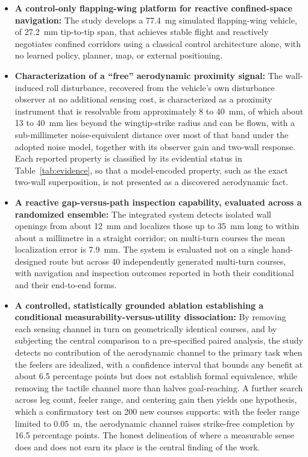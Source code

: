 \documentclass[final,5p,times]{elsarticle}
\begin{document}
\begin{itemize}
    \item \textbf{A control-only flapping-wing platform for reactive confined-space navigation:} The study develops a 77.4~mg simulated flapping-wing vehicle, of 27.2~mm tip-to-tip span, that achieves stable flight and reactively negotiates confined corridors using a classical control architecture alone, with no learned policy, planner, map, or external positioning.
    \item \textbf{Characterization of a ``free'' aerodynamic proximity signal:} The wall-induced roll disturbance, recovered from the vehicle's own disturbance observer at no additional sensing cost, is characterized as a proximity instrument that is resolvable from approximately 8 to 40~mm, of which about 13 to 40~mm lies beyond the wingtip-strike radius and can be flown, with a sub-millimeter noise-equivalent distance over most of that band under the adopted noise model, together with its observer gain and two-wall response. Each reported property is classified by its evidential status in Table~\ref{tab:evidence}, so that a model-encoded property, such as the exact two-wall superposition, is not presented as a discovered aerodynamic fact.
    \item \textbf{A reactive gap-versus-path inspection capability, evaluated across a randomized ensemble:} The integrated system detects isolated wall openings from about 12~mm and localizes those up to 35~mm long to within about a millimetre in a straight corridor; on multi-turn courses the mean localization error is 7.9~mm. The system is evaluated not on a single hand-designed route but across 40 independently generated multi-turn courses, with navigation and inspection outcomes reported in both their conditional and their end-to-end forms.
    \item \textbf{A controlled, statistically grounded ablation establishing a conditional measurability-versus-utility dissociation:} By removing each sensing channel in turn on geometrically identical courses, and by subjecting the central comparison to a pre-specified paired analysis, the study detects no contribution of the aerodynamic channel to the primary task when the feelers are idealized, with a confidence interval that bounds any benefit at about 6.5 percentage points but does not establish formal equivalence, while removing the tactile channel more than halves goal-reaching. A further search across leg count, feeler range, and centering gain then yields one hypothesis, which a confirmatory test on 200 new courses supports: with the feeler range limited to 0.05~m, the aerodynamic channel raises strike-free completion by 16.5 percentage points. The honest delineation of where a measurable sense does and does not earn its place is the central finding of the work.
\end{itemize}
\end{document}
